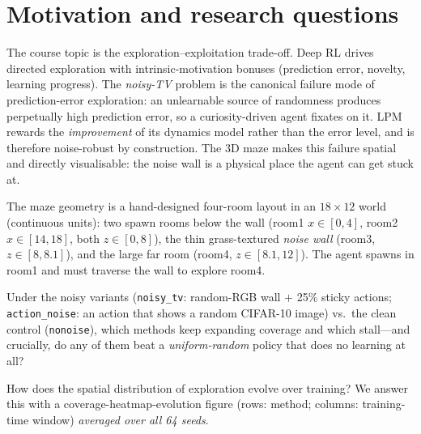 \documentclass[11pt]{article}
\begin{document}
\section{Motivation and research questions}
The course topic is the exploration--exploitation trade-off. Deep RL drives directed exploration
with intrinsic-motivation bonuses (prediction error, novelty, learning progress). The \emph{noisy-TV}
problem is the canonical failure mode of prediction-error exploration: an unlearnable source of
randomness produces perpetually high prediction error, so a curiosity-driven agent fixates on it.
LPM rewards the \emph{improvement} of its dynamics model rather than the error level, and is
therefore noise-robust by construction. The 3D maze makes this failure spatial and directly
visualisable: the noise wall is a physical place the agent can get stuck at.

The maze geometry is a hand-designed four-room layout in an $18\times 12$ world (continuous units):
two spawn rooms below the wall (room1 $x\!\in\![0,4]$, room2 $x\!\in\![14,18]$, both $z\!\in\![0,8]$),
the thin grass-textured \emph{noise wall} (room3, $z\!\in\![8,8.1]$), and the large far room
(room4, $z\!\in\![8.1,12]$). The agent spawns in room1 and must traverse the wall to explore room4.

\begin{description}[leftmargin=2.2em,style=nextline]
  \item[RQ1 (coverage \& noise robustness, reproduction).] Under the noisy variants
  (\texttt{noisy\_tv}: random-RGB wall $+$ 25\% sticky actions; \texttt{action\_noise}: an action
  that shows a random CIFAR-10 image) vs.\ the clean control (\texttt{nonoise}), which methods keep
  expanding coverage and which stall---and crucially, do any of them beat a \emph{uniform-random}
  policy that does no learning at all?
  \item[RQ2 (spatial dynamics, novelty).] How does the spatial distribution of exploration evolve
  over training? We answer this with a coverage-heatmap-evolution figure (rows: method; columns:
  training-time window) \emph{averaged over all 64 seeds}.
\end{description}
\end{document}
